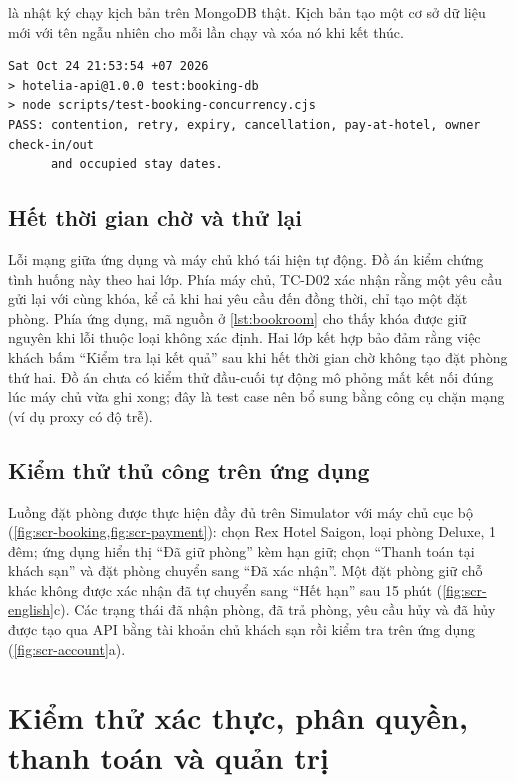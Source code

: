  là nhật ký chạy kịch bản trên MongoDB thật. Kịch bản tạo một cơ sở dữ liệu mới với tên ngẫu nhiên cho mỗi lần chạy và xóa nó khi kết thúc.

\begin{lstlisting}[caption={Nhật ký kiểm thử tranh chấp trên MongoDB 7.0 replica set}, label={lst:dblog}, numbers=none]
Sat Oct 24 21:53:54 +07 2026
> hotelia-api@1.0.0 test:booking-db
> node scripts/test-booking-concurrency.cjs
PASS: contention, retry, expiry, cancellation, pay-at-hotel, owner check-in/out
      and occupied stay dates.
\end{lstlisting}

\subsection{Hết thời gian chờ và thử lại}

Lỗi mạng giữa ứng dụng và máy chủ khó tái hiện tự động. Đồ án kiểm chứng tình huống này theo hai lớp. Phía máy chủ, TC-D02 xác nhận rằng một yêu cầu gửi lại với cùng khóa, kể cả khi hai yêu cầu đến đồng thời, chỉ tạo một đặt phòng. Phía ứng dụng, mã nguồn ở \cref{lst:bookroom} cho thấy khóa được giữ nguyên khi lỗi thuộc loại không xác định. Hai lớp kết hợp bảo đảm rằng việc khách bấm ``Kiểm tra lại kết quả'' sau khi hết thời gian chờ không tạo đặt phòng thứ hai. Đồ án chưa có kiểm thử đầu-cuối tự động mô phỏng mất kết nối đúng lúc máy chủ vừa ghi xong; đây là test case nên bổ sung bằng công cụ chặn mạng (ví dụ proxy có độ trễ).

\subsection{Kiểm thử thủ công trên ứng dụng}

Luồng đặt phòng được thực hiện đầy đủ trên Simulator với máy chủ cục bộ (\cref{fig:scr-booking,fig:scr-payment}): chọn Rex Hotel Saigon, loại phòng Deluxe, 1 đêm; ứng dụng hiển thị ``Đã giữ phòng'' kèm hạn giữ; chọn ``Thanh toán tại khách sạn'' và đặt phòng chuyển sang ``Đã xác nhận''. Một đặt phòng giữ chỗ khác không được xác nhận đã tự chuyển sang ``Hết hạn'' sau 15 phút (\cref{fig:scr-english}c). Các trạng thái đã nhận phòng, đã trả phòng, yêu cầu hủy và đã hủy được tạo qua API bằng tài khoản chủ khách sạn rồi kiểm tra trên ứng dụng (\cref{fig:scr-account}a).

\section{Kiểm thử xác thực, phân quyền, thanh toán và quản trị}\label{sec:test-auth}

